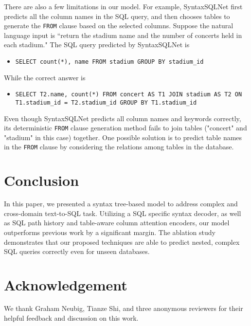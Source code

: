 \documentclass[11pt,a4paper]{article}
\begin{document}
There are also a few limitations in our model. For example, SyntaxSQLNet first predicts all the column names in the SQL query, and then chooses tables to generate the \texttt{FROM} clause based on the selected columns. Suppose the natural language input is ``return the stadium name and the number of concerts held in each stadium." The SQL query predicted by SyntaxSQLNet is
\begin{itemize}
    \item[] \texttt{SELECT count(*), name FROM stadium GROUP BY stadium\_id}
\end{itemize}
While the correct answer is
\begin{itemize}
    \item[] \texttt{SELECT T2.name,  count(*) FROM concert AS T1 JOIN stadium AS T2 ON T1.stadium\_id  =  T2.stadium\_id GROUP BY T1.stadium\_id}
\end{itemize}
Even though SyntaxSQLNet predicts all column names and keywords correctly, its deterministic \texttt{FROM} clause generation method fails to join tables ("concert" and "stadium" in this case) together. One possible solution is to predict table names in the \texttt{FROM} clause by considering the relations among tables in the database.

\section{Conclusion}
\label{sec:conclusion}

In this paper, we presented a syntax tree-based model to address complex and cross-domain text-to-SQL task. Utilizing a SQL specific syntax decoder, as well as SQL path history and table-aware column attention encoders, our model outperforms previous work by a significant margin. The ablation study demonstrates that our proposed techniques are able to predict nested, complex SQL queries correctly even for unseen databases.


\section*{Acknowledgement}
We thank Graham Neubig, Tianze Shi, and three anonymous reviewers for their helpful feedback and discussion on this work.



\end{document}
